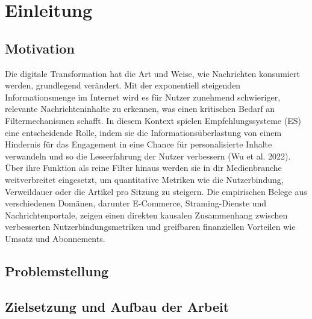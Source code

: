 \section{Einleitung}

\subsection{Motivation}
Die digitale Transformation hat die Art und Weise, wie Nachrichten konsumiert werden, grundlegend verändert. 
Mit der exponentiell steigenden Informationsmenge im Internet wird es für Nutzer zunehmend schwieriger, 
relevante Nachrichteninhalte zu erkennen, was einen kritischen Bedarf an Filtermechanismen schafft. 
In diesem Kontext spielen Empfehlungssysteme (ES) eine entscheidende Rolle, 
indem sie die Informationsüberlastung von einem Hindernis für das Engagement in eine Chance für personalisierte 
Inhalte verwandeln und so die Leseerfahrung der Nutzer verbessern (Wu et al. 2022).
\newline
Über ihre Funktion als reine Filter hinaus werden sie in dir Medienbranche weitverbreitet eingesetzt, 
um quantitative Metriken wie die Nutzerbindung, Verweildauer oder die Artikel pro Sitzung zu steigern. 
Die empirischen Belege aus verschiedenen Domänen, darunter E-Commerce, Straming-Dienste
und Nachrichtenportale, zeigen einen direkten kausalen Zusammenhang zwischen verbesserten
Nutzerbindungsmetriken und greifbaren finanziellen Vorteilen wie Umsatz und Abonnements. \cite{}


\subsection{Problemstellung}

\subsection{Zielsetzung und Aufbau der Arbeit}
